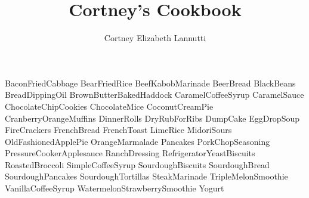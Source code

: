 \documentclass[a4paper, titlepage]{book}
\title{Cortney's Cookbook}
\author{Cortney Elizabeth Lannutti}
\date{}
\begin{document}
\maketitle
{}
\tableofcontents
\newpage
{}

{BaconFriedCabbage}
{BearFriedRice}
{BeefKabobMarinade}
{BeerBread}
{BlackBeans}
{BreadDippingOil}
{BrownButterBakedHaddock}
{CaramelCoffeeSyrup}
{CaramelSauce}
{ChocolateChipCookies}
{ChocolateMice}
{CoconutCreamPie}
{CranberryOrangeMuffins}
{DinnerRolls}
{DryRubForRibs}
{DumpCake}
{EggDropSoup}
{FireCrackers}
{FrenchBread}
{FrenchToast}
{LimeRice}
{MidoriSours}
{OldFashionedApplePie}
{OrangeMarmalade}
{Pancakes}
{PorkChopSeasoning}
{PressureCookerApplesauce}
{RanchDressing}
{RefrigeratorYeastBiscuits}
{RoastedBroccoli}
{SimpleCoffeeSyrup}
{SourdoughBiscuits}
{SourdoughBread}
{SourdoughPancakes}
{SourdoughTortillas}
{SteakMarinade}
{TripleMelonSmoothie}
{VanillaCoffeeSyrup}
{WatermelonStrawberrySmoothie}
{Yogurt}
\end{document}
